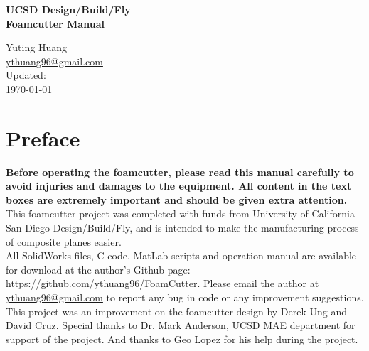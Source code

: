 \documentclass[titlepage,12pt,letter]{report}
\numberwithin{equation}{chapter}
\begin{document}
\begin{titlepage}
	\centering
	\vspace*{2.5in}
	{\huge\textbf{UCSD Design/Build/Fly\\Foamcutter Manual} \par}
	
	\vspace{2.5in}
	{\large Yuting Huang \\
		\href{mailto:ythuang96@gmail.com}{ythuang96@gmail.com}} \\
	\vspace{1.5in}
	{\large
		Updated: \\
		\today }
	\vspace{1in}
\end{titlepage}

\chapter*{Preface}
\textbf{Before operating the foamcutter, please read this manual carefully to avoid injuries and damages to the equipment. All content in the text boxes are extremely important and should be given extra attention.} \\ 

This foamcutter project was completed with funds from University of California San Diego Design/Build/Fly, and is intended to make the manufacturing process of composite planes easier. \\

All SolidWorks files, C code, MatLab scripts and operation manual are available for download at the author's Github page: \href{https://github.com/ythuang96/FoamCutter}{https://github.com/ythuang96/FoamCutter}. Please email the author at \href{mailto:ythuang96@gmail.com}{ythuang96@gmail.com} to report any bug in code or any improvement suggestions. \\

This project was an improvement on the foamcutter design by Derek Ung and David Cruz. Special thanks to Dr. Mark Anderson, UCSD MAE department for support of the project. And thanks to Geo Lopez for his help during the project.\\
\end{document}
